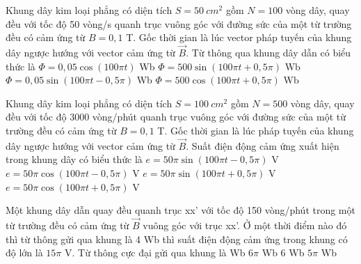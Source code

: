 \begin{vidu}%
	Khung dây kim loại phẳng có diện tích $S = 50\ cm^2$ gồm $N = 100$ vòng dây, quay đều với tốc độ 50 vòng/s quanh trục vuông góc với đường sức của một từ trường đều có cảm ứng từ $B = 0,1$ T. Gốc thời gian là lúc vector pháp tuyến của khung dây ngược hướng với vector cảm ứng từ $ \vec{B} $. Từ thông qua khung dây dẫn có biểu thức là
	\choice
	{$\Phi = 0,05\cos (100\pi t)$ Wb}
	{$\Phi = 500\sin(100\pi t + 0,5\pi)$ Wb}
	{\True $\Phi = 0,05\sin(100\pi t - 0,5\pi)$ Wb}
	{$\Phi = 500\cos (100\pi t + 0,5\pi)$ Wb}
\end{vidu}
\begin{vidu}%
	Khung dây kim loại phẳng có diện tích $S = 100\ cm^2$ gồm $N = 500$ vòng dây, quay đều với tốc độ 3000 vòng/phút quanh trục vuông góc với đường sức của một từ trường đều có cảm ứng từ $B = 0,1$ T. Gốc thời gian là lúc pháp tuyến của khung dây ngược hướng với vector cảm ứng từ $\vec{B} $. Suất điện động cảm ứng xuất hiện trong khung dây có biểu thức là
	\choice
	{$e = 50\pi \sin(100\pi t - 0,5\pi)$ V}
	{$e = 50\pi \cos (100\pi t - 0,5\pi)$ V}
	{$e = 50\pi \sin(100\pi t + 0,5\pi)$ V}
	{\True $e = 50\pi \cos (100\pi t + 0,5\pi)$ V}
\end{vidu}
\begin{vidu}%
	Một khung dây dẫn quay đều quanh trục xx’ với tốc độ 150 vòng/phút trong một từ trường đều có cảm ứng từ $ \vec{B} $ vuông góc với trục xx’. Ở một thời điểm nào đó thì từ thông gửi qua khung là 4 Wb thì suất điện động cảm ứng trong khung có độ lớn là $15\pi$ V. Từ thông cực đại gửi qua khung là
	\choice
	{ Wb}
	{$6\pi$ Wb}
	{6 Wb}
	{$5\pi$ Wb}
\end{vidu}
